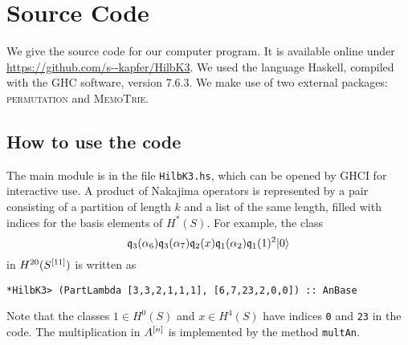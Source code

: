 \appendix
\section{Source Code}
We give the source code for our computer program. It is available online under \url{https://github.com/s--kapfer/HilbK3}. We used the language Haskell, compiled with the \textsc{GHC} software, version 7.6.3. We make use of two external packages: \textsc{permutation} and \textsc{MemoTrie}.

\subsection{How to use the code}
The main module is in the file \verb|HilbK3.hs|, which can be opened by \textsc{GHCI} for interactive use. A product of Nakajima operators is represented by a pair consisting of a partition of length $k$ and a list of the same length, filled with indices for the basis elements of $H^*(S)$. For example, the class
$$
\mathfrak{q}_{3}(\alpha_6)\mathfrak{q}_{3}(\alpha_7)\mathfrak{q}_2(x)\mathfrak{q}_{1}(\alpha_2)\mathfrak{q}_{1}(1)^2 |0\rangle 
$$
in $H^{20}(S^{[11]})$ is written as
\begin{verbatim}
*HilbK3> (PartLambda [3,3,2,1,1,1], [6,7,23,2,0,0]) :: AnBase 
\end{verbatim}
Note that the classes $1\in H^0(S)$ and $x\in H^4(S)$ have indices \verb|0| and \verb|23| in the code.
The multiplication in $A^{[n]}$ is implemented by the method \verb|multAn|. 

